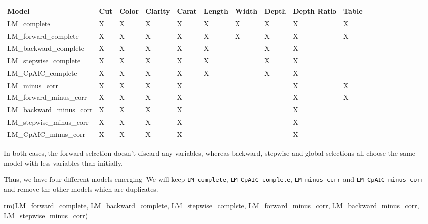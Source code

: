\documentclass[
]{article}
\newenvironment{Shaded}{\begin{snugshade}}{\end{snugshade}}
\newcommand{\FunctionTok}[1]{\textcolor[rgb]{0.00,0.00,0.00}{#1}}
\newcommand{\NormalTok}[1]{#1}
\begin{document}
\begin{table}
\centering
\begin{tabu} to 
\hline
Model & Cut & Color & Clarity & Carat & Length & Width & Depth & Depth Ratio & Table\\
\hline
LM\_complete & X & X & X & X & X & X & X & X & X\\
\hline
LM\_forward\_complete & X & X & X & X & X & X & X & X & X\\
\hline
LM\_backward\_complete & X & X & X & X & X &  & X & X & \\
\hline
LM\_stepwise\_complete & X & X & X & X & X &  & X & X & \\
\hline
LM\_CpAIC\_complete & X & X & X & X & X &  & X & X & \\
\hline
LM\_minus\_corr & X & X & X & X &  &  &  & X & X\\
\hline
LM\_forward\_minus\_corr & X & X & X & X &  &  &  & X & X\\
\hline
LM\_backward\_minus\_corr & X & X & X & X &  &  &  & X & \\
\hline
LM\_stepwise\_minus\_corr & X & X & X & X &  &  &  & X & \\
\hline
LM\_CpAIC\_minus\_corr & X & X & X & X &  &  &  & X & \\
\hline
\end{tabu}
\end{table}

In both cases, the forward selection doesn't discard any variables,
whereas backward, stepwise and global selections all choose the same
model with less variables than initially.

Thus, we have four different models emerging. We will keep
\texttt{LM\_complete}, \texttt{LM\_CpAIC\_complete},
\texttt{LM\_minus\_corr} and \texttt{LM\_CpAIC\_minus\_corr} and remove
the other models which are duplicates.

\begin{Shaded}
\begin{Highlighting}[]
\FunctionTok{rm}\NormalTok{(LM\_forward\_complete, LM\_backward\_complete, LM\_stepwise\_complete, LM\_forward\_minus\_corr, LM\_backward\_minus\_corr, LM\_stepwise\_minus\_corr)}
\end{Highlighting}
\end{Shaded}
\end{document}
